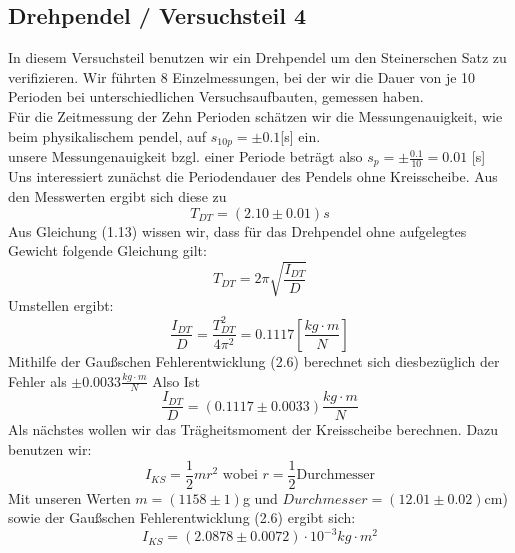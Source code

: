 \documentclass[11pt,a4paper]{article}
\begin{document}
	\subsection{Drehpendel / Versuchsteil 4}
	In diesem Versuchsteil benutzen wir ein Drehpendel um den Steinerschen Satz zu verifizieren.
	Wir führten 8 Einzelmessungen, bei der wir die  Dauer von je 10 Perioden bei unterschiedlichen Versuchsaufbauten, gemessen haben.\\
	Für die Zeitmessung der Zehn Perioden schätzen wir die Messungenauigkeit, wie beim physikalischem pendel, auf $s_{10p}=\pm 0.1$[s] ein.\\
	unsere Messungenauigkeit bzgl. einer Periode beträgt also $s_p=\pm \frac{0.1}{10} =0.01$ [s]
	\\
	Uns interessiert zunächst die Periodendauer des Pendels ohne Kreisscheibe. Aus den Messwerten
	ergibt sich diese zu $$T_{DT}=(2.10\pm 0.01)s$$
	Aus Gleichung (1.13) wissen wir, dass für das Drehpendel ohne aufgelegtes Gewicht folgende Gleichung gilt:
	\begin{equation}
	T_{DT}=2 \pi \sqrt{\frac{I_{DT}}{D}}
	\end{equation}
	Umstellen ergibt:
	\begin{equation}
	\frac{I_{DT}}{D} = \frac{T_{DT}^2}{4 \pi^2}=0.1117[\frac{kg\cdot m}{N}]
	\end{equation}
	Mithilfe der Gaußschen Fehlerentwicklung (2.6) berechnet sich diesbezüglich der Fehler als $\pm 0.0033
	\frac{kg \cdot m}{N}$
	Also Ist
	\begin{equation}
	\frac{I_{DT}}{D} =(0.1117 \pm 0.0033)\frac{kg\cdot m}{N}
	\end{equation}
	Als nächstes wollen wir das Trägheitsmoment der Kreisscheibe berechnen. Dazu benutzen wir:
	\begin{equation}
	I_{KS}=\frac{1}{2}m r^2 \text{  wobei  } r=\frac{1}{2} \text{Durchmesser}
	\end{equation}
	Mit unseren Werten $m=(1158\pm 1)$g und $Durchmesser=(12.01 \pm 0.02)$cm) sowie der Gaußschen
	Fehlerentwicklung (2.6) ergibt sich:
	\begin{equation}
	I_{KS}=(2.0878 \pm 0.0072)\cdot 10^{-3} kg \cdot m^2
	\end{equation}
\end{document}
